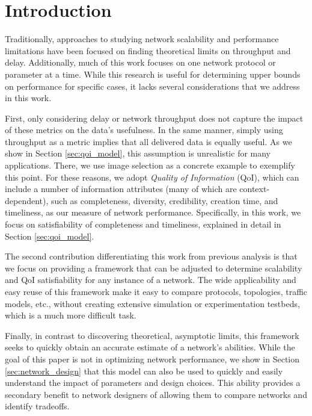 \section{Introduction}
\label{sec:intro}


Traditionally, approaches to studying network scalability and performance limitations have been focused on finding theoretical limits on throughput and delay.  Additionally, much of this work focuses on one network protocol or parameter at a time.  While this research is useful for determining upper bounds on performance for specific cases, it lacks several considerations that we address in this work.  

First, only considering delay or network throughput does not capture the impact of these metrics on the data's usefulness.  In the same manner, simply using throughput as a metric implies that all delivered data is equally useful.  As we show in Section \ref{sec:qoi_model}, this assumption is unrealistic for many applications. There, we use image selection as a concrete example to exemplify this point. For these reasons, we adopt \emph{Quality of Information} (QoI), which can include a number of information attributes (many of which are context-dependent), such as completeness, diversity, credibility, creation time, and timeliness, as our measure of network performance.  Specifically, in this work, we focus on satisfiability of completeness and timeliness, explained in detail in Section \ref{sec:qoi_model}.

The second contribution differentiating this work from previous analysis is that we focus on providing a framework that can be adjusted to determine scalability and QoI satisfiability for any instance of a network.  The wide applicability and easy reuse of this framework make it easy to compare protocols, topologies, traffic models, etc., without creating extensive simulation or experimentation testbeds, which is a much more difficult task.

Finally, in contrast to discovering theoretical, asymptotic limits, this framework seeks to quickly obtain an accurate estimate of a network's abilities.  While the goal of this paper is not in optimizing network performance, we show in Section \ref{sec:network_design} that this model can also be used to quickly and easily understand the impact of parameters and design choices.  This ability provides a secondary benefit to network designers of allowing them to compare networks and identify tradeoffs. 

